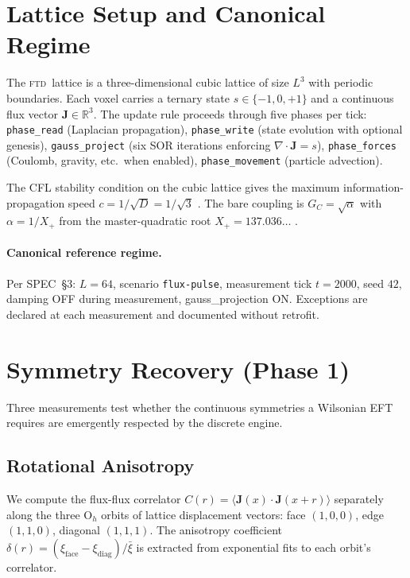 \documentclass[11pt,letterpaper]{article}
\newcommand{\FTD}{\textsc{ftd}}
\begin{document}
\section{Lattice Setup and Canonical Regime}
\label{sec:setup}

The \FTD\ lattice is a three-dimensional cubic lattice of size $L^3$
with periodic boundaries. Each voxel carries a ternary state $s \in
\{-1, 0, +1\}$ and a continuous flux vector $\mathbf{J} \in \mathbb{R}^3$.
The update rule proceeds through five phases per tick: \texttt{phase\_read}
(Laplacian propagation), \texttt{phase\_write} (state evolution with
optional genesis), \texttt{gauss\_project} (six SOR iterations enforcing
$\nabla \cdot \mathbf{J} = s$), \texttt{phase\_forces} (Coulomb, gravity,
etc.\ when enabled), \texttt{phase\_movement} (particle advection).

The CFL stability condition on the cubic lattice gives the maximum
information-propagation speed $c = 1/\sqrt{D} = 1/\sqrt{3}$
\cite{FTDSpec}. The bare coupling is $G_C = \sqrt{\alpha}$ with
$\alpha = 1/X_+$ from the master-quadratic root
$X_+ = 137.036\ldots$ \cite{AlphaDerivation}.

\paragraph{Canonical reference regime.} Per SPEC~\S3: $L = 64$, scenario
\texttt{flux-pulse}, measurement tick $t = 2000$, seed $42$, damping OFF
during measurement, gauss\_projection ON. Exceptions are declared at
each measurement and documented without retrofit.

\section{Symmetry Recovery (Phase 1)}
\label{sec:symmetry}

Three measurements test whether the continuous symmetries a Wilsonian
EFT requires are emergently respected by the discrete engine.

\subsection{Rotational Anisotropy}

We compute the flux-flux correlator $C(r) = \langle \mathbf{J}(x) \cdot
\mathbf{J}(x+r) \rangle$ separately along the three O$_h$ orbits of
lattice displacement vectors: face $(1,0,0)$, edge $(1,1,0)$, diagonal
$(1,1,1)$. The anisotropy coefficient $\delta(r) = (\xi_{\mathrm{face}} -
\xi_{\mathrm{diag}})/\bar\xi$ is extracted from exponential fits to each
orbit's correlator.
\end{document}
